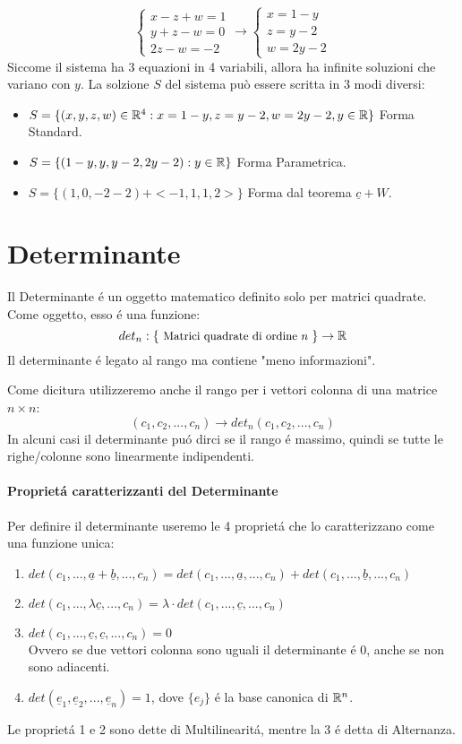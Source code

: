 {\begin{enumerate}
\[\begin{cases}
				      x-z+w=1 \\
				      y+z-w=0 \\
				      2z-w = -2
			      \end{cases}
			      \to
			      \begin{cases}
				      x=1-y \\
				      z=y-2 \\
				      w = 2y-2
			      \end{cases}
		      \]
		      Siccome il sistema ha 3 equazioni in 4 variabili, allora ha infinite soluzioni che variano con $y$.
		      La solzione $S$ del sistema può essere scritta in 3 modi diversi:
		      \begin{itemize}
			      \item $S=\{(x,y,z,w)\in \mathbb{R}^4 : x=1-y,z=y-2,w=2y-2, y\in \mathbb{R} \}$ Forma Standard.
			      \item $S=\{(1-y,y,y-2,2y-2):y\in\mathbb{R}\}$ Forma Parametrica.
			      \item $S=\{(1,0,-2-2)+<-1,1,1,2>\}$ Forma dal teorema $\underline{c} + W$.
		      \end{itemize}
	\end{enumerate}
}

\section{Determinante}
Il Determinante é un oggetto matematico definito solo per matrici quadrate.
Come oggetto, esso é una funzione:
\[
	det_n : \{\text{ \small{Matrici quadrate di ordine $n$} }	\} \to \mathbb{R}
\]
Il determinante é legato al rango ma contiene "meno informazioni".

Come dicitura utilizzeremo anche il rango per i vettori colonna di una matrice $n\times n$:
\[ (c_1,c_2, ... ,c_n) \to det_n(c_1,c_2,...,c_n)\]
In alcuni casi il determinante puó dirci se il rango é massimo, quindi se tutte le righe/colonne sono linearmente indipendenti.

\paragraph{Proprietá caratterizzanti del Determinante}
Per definire il determinante useremo le 4 proprietá che lo caratterizzano come una funzione unica:
\begin{enumerate}
	\item $det(c_1,...,\underline{a}+ \underline{b},...,c_n) = det(c_1,...,\underline{a},...,c_n) + det(c_1,...,\underline{b},...,c_n)$
	\item $det(c_1,...,\lambda \underline{c},...,c_n) = \lambda \cdot det(c_1,...,\underline{c},...,c_n)$
	\item $det(c_1,...,\underline{c}, \underline{c},...,c_n) = 0$ \\
	      Ovvero se due vettori colonna sono uguali il determinante é 0, anche se non sono adiacenti.
	\item $det(\underline{e}_1, \underline{e}_2,...,\underline{e}_n) = 1$, dove $\{e_j\}$ é la base canonica di $\mathbb{R}^n$.

\end{enumerate}
Le proprietá 1 e 2 sono dette di Multilinearitá, mentre la 3 é detta di Alternanza.

